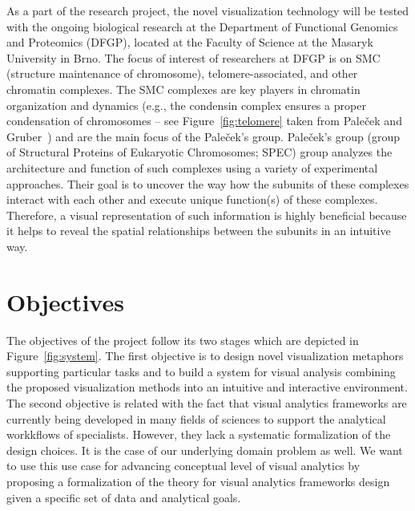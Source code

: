 \documentclass[11pt,a4paper,titlepage,oneside,onecolumn]{article}
\begin{document}

As a part of the research project, the novel visualization technology will be tested with the ongoing biological research at the Department of Functional Genomics and Proteomics (DFGP), located at the Faculty of Science at the Masaryk University in Brno. 
The focus of interest of researchers at DFGP is on SMC (structure maintenance of chromosome), telomere-associated, and other chromatin complexes. 
The SMC complexes are key players in chromatin organization and dynamics (e.g., the condensin complex ensures a proper condensation of chromosomes -- see Figure~\ref{fig:telomere} taken from Pale\v{c}ek and Gruber~\cite{Palecek2015}) and are the main focus of the Pale\v{c}ek's group.
Pale\v{c}ek's group (group of Structural Proteins of Eukaryotic Chromosomes; SPEC) group analyzes the architecture and function of such complexes using a variety of experimental approaches. 
Their goal is to uncover the way how the subunits of these complexes interact with each other and execute unique function(s) of these complexes. 
Therefore, a visual representation of such information is highly beneficial because it helps to reveal the spatial relationships between the subunits in an intuitive way.


\section{Objectives}
The objectives of the project follow its two stages which are depicted in Figure~\ref{fig:system}.
The first objective is to design novel visualization metaphors supporting particular tasks and to build a system for visual analysis combining the proposed visualization methods into an intuitive and interactive environment.
The second objective is related with the fact that visual analytics frameworks are currently being developed in many fields of sciences to support the analytical workkflows of specialists. 
However, they lack a systematic formalization of the design choices.
It is the case of our underlying domain problem as well. 
We want to use this use case for advancing conceptual level of visual analytics by proposing a formalization of the theory for visual analytics frameworks design given a specific set of data and analytical goals.
\end{document}
